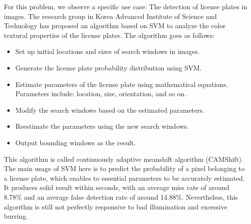 For this problem, we observe a specific use case: The detection of
license plates in images. The research group in Korea Advanced Institute of 
Science and Technology has proposed an algorithm based on SVM to analyze the 
color textural properties of the license plates. The algorithm goes as
follows:

\begin{itemize}
    \item Set up initial locations and sizes of search windows in images.
    \item Generate the license plate probability distribution using SVM.
    \item Estimate parameters of the license plate using mathematical equations.
    Parameters include: location, size, orientation, and so on.
    \item Modify the search windows based on the estimated parameters.
    \item Reestimate the parameters using the new search windows.
    \item Output bounding windows as the result.
\end{itemize}

This algorithm is called continuously adaptive meanshift algorithm (CAMShift).
The main usage of SVM here is to predict the probability of a pixel belonging
to a license plate, which enables to essential parameters to be accurately estimated.
It produces solid result within seconds, with an average miss rate of around
8.78\% and an average false detection rate of around 14.88\%.
Nevertheless, this algorithm is still not perfectly responsive to bad illumination
and excessive burring.
\cite{image-classification}
